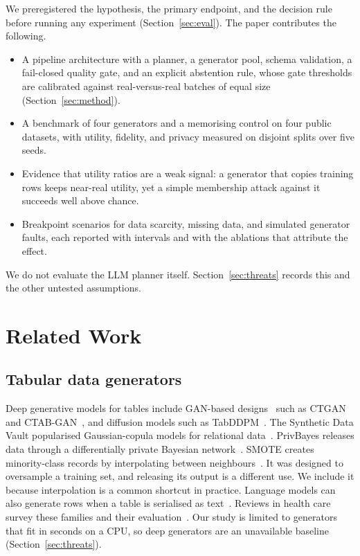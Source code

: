 \documentclass[journal]{IEEEtran}
\begin{document}
We preregistered the hypothesis, the primary endpoint, and the decision rule before running any experiment (Section~\ref{sec:eval}). The paper contributes the following.
\begin{itemize}
\item A pipeline architecture with a planner, a generator pool, schema validation, a fail-closed quality gate, and an explicit abstention rule, whose gate thresholds are calibrated against real-versus-real batches of equal size (Section~\ref{sec:method}).
\item A benchmark of four generators and a memorising control on four public datasets, with utility, fidelity, and privacy measured on disjoint splits over five seeds.
\item Evidence that utility ratios are a weak signal: a generator that copies training rows keeps near-real utility, yet a simple membership attack against it succeeds well above chance.
\item Breakpoint scenarios for data scarcity, missing data, and simulated generator faults, each reported with intervals and with the ablations that attribute the effect.
\end{itemize}
We do not evaluate the LLM planner itself. Section~\ref{sec:threats} records this and the other untested assumptions.

\section{Related Work}
\label{sec:related}

\subsection{Tabular data generators}
Deep generative models for tables include GAN-based designs~\cite{goodfellow2014gan} such as CTGAN~\cite{xu2019ctgan} and CTAB-GAN~\cite{zhao2021ctabgan}, and diffusion models such as TabDDPM~\cite{kotelnikov2023tabddpm}. The Synthetic Data Vault popularised Gaussian-copula models for relational data~\cite{patki2016sdv}. PrivBayes releases data through a differentially private Bayesian network~\cite{zhang2017privbayes}. SMOTE creates minority-class records by interpolating between neighbours~\cite{chawla2002smote}. It was designed to oversample a training set, and releasing its output is a different use. We include it because interpolation is a common shortcut in practice. Language models can also generate rows when a table is serialised as text~\cite{borisov2023great}. Reviews in health care survey these families and their evaluation~\cite{hernandez2022synthetic,chen2021synthetic}. Our study is limited to generators that fit in seconds on a CPU, so deep generators are an unavailable baseline (Section~\ref{sec:threats}).
\end{document}

